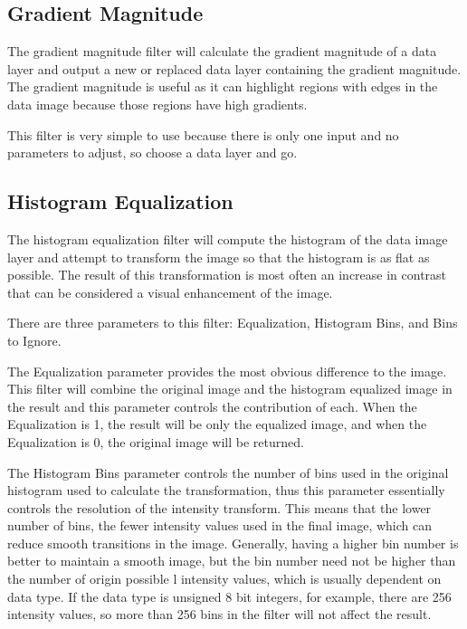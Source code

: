\documentclass[fleqn,11pt,openany]{book}
\begin{document}
\subsection{Gradient Magnitude}

The gradient magnitude filter will calculate the gradient magnitude of a data layer and output a new or replaced data layer containing the gradient magnitude.   The gradient magnitude is useful as it can highlight regions with edges in the data image because those regions have high gradients.  

This filter is very simple to use because there is only one input and no parameters to adjust, so choose a data layer and go.

\subsection{Histogram Equalization}

The histogram equalization filter will compute the histogram of the data image layer and attempt to transform the image so that the histogram is as flat as possible.  The result of this transformation is most often an increase in contrast that can be considered a visual enhancement of the image.  

There are three parameters to this filter:  Equalization, Histogram Bins, and Bins to Ignore.  

The Equalization parameter provides the most obvious difference to the image.  This filter will combine the original image and the histogram equalized image in the result and this parameter controls the contribution of each.  When the Equalization is 1, the result will be only the equalized image, and when the Equalization is 0, the original image will be returned.  

The Histogram Bins parameter controls the number of bins used in the original histogram used to calculate the transformation, thus this parameter essentially controls the resolution of the intensity transform.   This means that the lower number of bins, the fewer intensity values used in the final image, which can reduce smooth transitions in the image.  Generally, having a higher bin number is better to maintain a smooth image, but the bin number need not be higher than the number of origin possible l intensity values, which is usually dependent on data type.  If the data type is unsigned 8 bit integers, for example, there are 256 intensity values, so more than 256 bins in the filter will not affect the result.  
\end{document}

